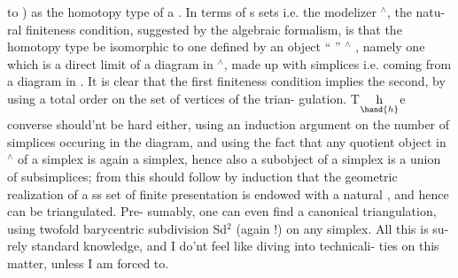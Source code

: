 to )  as the homotopy type of a \hand{\uline{\textcolor{black}{space admitting a finite}}}
\hand{\uline{\textcolor{black}{triangulation}}}.  In terms of s sets i.e.  the modelizer \hand{$\Delta$}$^\wedge$,  the natu-%
ral finiteness condition,  suggested by the algebraic formalism,  is
that the homotopy type be isomorphic to one defined by an object ``\hand{\uline{\textcolor{black}{of}}}
\hand{\uline{\textcolor{black}{finite presentation}}}'' \hand{\uline{\textcolor{black}{in}}} \hand{$\Delta$}$^\wedge$ ,  namely one which is a direct limit of
a \hand{\uline{\textcolor{black}{finite}}} diagram in \hand{$\Delta$}$^\wedge$,  made up with simplices  i.e. coming from a
diagram in \hand{$\Delta$}.  It is clear that the first finiteness condition implies
the second,  by using a total order on the set of vertices of the trian-%
gulation.  T\(\underset{\hand{h}}{\text{h}}\)e converse  should'nt be hard either,  using an induction
argument on the number of simplices occuring in the diagram,  and using
the fact that any  quotient object in \hand{$\Delta$}$^\wedge$ of a simplex is
again a simplex,  hence also a subobject of a simplex is a union of
subsimplices;  from this should follow by induction that the geometric
realization of a  ss set of finite presentation is endowed with a
natural  \hand{\uline{\textcolor{black}{piecewise}}} \hand{\uline{\textcolor{black}{linear structure}}},  and hence can be  triangulated. Pre-%
sumably,  one can even find a canonical triangulation,  using twofold
barycentric subdivision Sd$^2$ (again !)  on any simplex.  All this is su-%
rely standard knowledge,  and I do'nt feel like diving into technicali-%
ties on this matter,  unless I am forced to.

